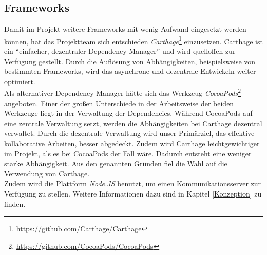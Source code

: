 \subsection{Frameworks}
Damit im Projekt weitere Frameworks mit wenig Aufwand eingesetzt werden können, hat das Projektteam sich entschieden \emph{Carthage}\footnote{\url{https://github.com/Carthage/Carthage}} einzusetzen. Carthage ist ein \enquote{einfacher, dezentraler Dependency-Manager} und wird quelloffen zur Verfügung gestellt. Durch die Auflösung von Abhängigkeiten, beispielsweise von bestimmten Frameworks, wird das asynchrone und dezentrale Entwickeln weiter optimiert. \\
Als alternativer Dependency-Manager hätte sich das Werkzeug \emph{CocoaPods}\footnote{\url{https://github.com/CocoaPods/CocoaPods}} angeboten. Einer der großen Unterschiede in der Arbeitsweise der beiden Werkzeuge liegt in der Verwaltung der Dependencies. Während CocoaPods auf eine zentrale Verwaltung setzt, werden die Abhängigkeiten bei Carthage dezentral verwaltet. Durch die dezentrale Verwaltung wird unser Primärziel, das effektive kollaborative Arbeiten, besser abgedeckt. Zudem wird Carthage leichtgewichtiger im Projekt, als es bei CocoaPods der Fall wäre. Dadurch entsteht eine weniger starke Abhängigkeit. Aus den genannten Gründen fiel die Wahl auf die Verwendung von Carthage. \\
Zudem wird die Plattform \emph{Node.JS} benutzt, um einen Kommunikationsserver zur Verfügung zu stellen. Weitere Informationen dazu sind in Kapitel \ref{Konzeption} zu finden. 










